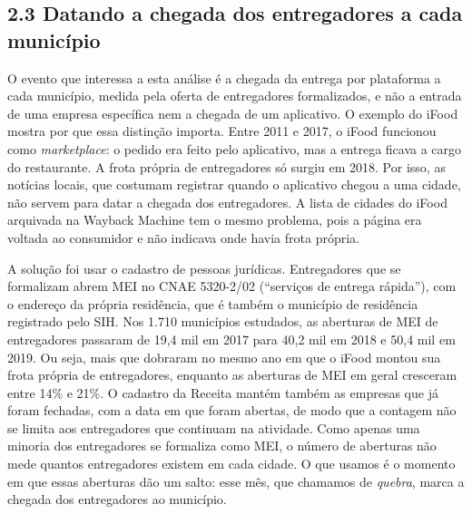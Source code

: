 \documentclass[
  11pt,
]{article}
\begin{document}
\hypertarget{construuxe7uxe3o-do-tratamento-model}{%
\subsection{2.3 Datando a chegada dos entregadores a cada município}\label{construuxe7uxe3o-do-tratamento-model}}

O evento que interessa a esta análise é a chegada da entrega por plataforma a cada município, medida pela oferta de entregadores formalizados, e não a entrada de uma empresa específica nem a chegada de um aplicativo. O exemplo do iFood mostra por que essa distinção importa. Entre 2011 e 2017, o iFood funcionou como \emph{marketplace}: o pedido era feito pelo aplicativo, mas a entrega ficava a cargo do restaurante. A frota própria de entregadores só surgiu em 2018. Por isso, as notícias locais, que costumam registrar quando o aplicativo chegou a uma cidade, não servem para datar a chegada dos entregadores. A lista de cidades do iFood arquivada na Wayback Machine tem o mesmo problema, pois a página era voltada ao consumidor e não indicava onde havia frota própria.

A solução foi usar o cadastro de pessoas jurídicas. Entregadores que se formalizam abrem MEI no CNAE 5320-2/02 (``serviços de entrega rápida''), com o endereço da própria residência, que é também o município de residência registrado pelo SIH. Nos 1.710 municípios estudados, as aberturas de MEI de entregadores passaram de 19,4 mil em 2017 para 40,2 mil em 2018 e 50,4 mil em 2019. Ou seja, mais que dobraram no mesmo ano em que o iFood montou sua frota própria de entregadores, enquanto as aberturas de MEI em geral cresceram entre 14\% e 21\%. O cadastro da Receita mantém também as empresas que já foram fechadas, com a data em que foram abertas, de modo que a contagem não se limita aos entregadores que continuam na atividade. Como apenas uma minoria dos entregadores se formaliza como MEI, o número de aberturas não mede quantos entregadores existem em cada cidade. O que usamos é o momento em que essas aberturas dão um salto: esse mês, que chamamos de \emph{quebra}, marca a chegada dos entregadores ao município.
\end{document}
